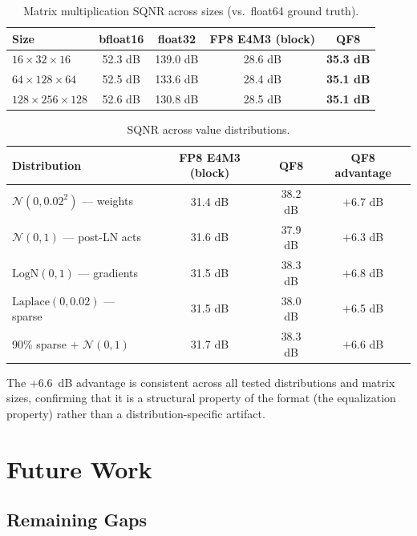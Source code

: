 \documentclass[11pt,letterpaper]{article}
\theoremstyle{definition}
\theoremstyle{remark}
\begin{document}
\begin{table}[ht]
\centering
\caption{Matrix multiplication SQNR across sizes (vs.\ float64 ground truth).}
\label{tab:matmul-sqnr}
\begin{tabular}{@{}lcccc@{}}
\toprule
Size & bfloat16 & float32 & FP8 E4M3 (block) & \textbf{QF8} \\
\midrule
$16 \times 32 \times 16$     & 52.3 dB & 139.0 dB & 28.6 dB & \textbf{35.3 dB} \\
$64 \times 128 \times 64$    & 52.5 dB & 133.6 dB & 28.4 dB & \textbf{35.1 dB} \\
$128 \times 256 \times 128$  & 52.6 dB & 130.8 dB & 28.5 dB & \textbf{35.1 dB} \\
\bottomrule
\end{tabular}
\end{table}

\begin{table}[ht]
\centering
\caption{SQNR across value distributions.}
\label{tab:dist-sqnr}
\begin{tabular}{@{}lccc@{}}
\toprule
Distribution & FP8 E4M3 (block) & QF8 & QF8 advantage \\
\midrule
$\mathcal{N}(0, 0.02^2)$ --- weights    & 31.4 dB & 38.2 dB & $+$6.7 dB \\
$\mathcal{N}(0, 1)$ --- post-LN acts    & 31.6 dB & 37.9 dB & $+$6.3 dB \\
$\mathrm{LogN}(0, 1)$ --- gradients     & 31.5 dB & 38.3 dB & $+$6.8 dB \\
$\mathrm{Laplace}(0, 0.02)$ --- sparse  & 31.5 dB & 38.0 dB & $+$6.5 dB \\
90\% sparse $+$ $\mathcal{N}(0,1)$      & 31.7 dB & 38.3 dB & $+$6.6 dB \\
\bottomrule
\end{tabular}
\end{table}

The $+6.6$~dB advantage is consistent across all tested distributions and
matrix sizes, confirming that it is a structural property of the format (the
equalization property) rather than a distribution-specific artifact.


\section{Future Work}
\label{sec:future}

\subsection{Remaining Gaps}
\end{document}
